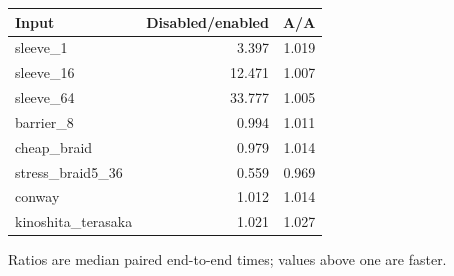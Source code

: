 \begin{center}
\begin{tabular}{@{}lrr@{}}
\toprule
Input & Disabled/enabled & A/A \\
\midrule
sleeve\_1 & 3.397 & 1.019 \\
sleeve\_16 & 12.471 & 1.007 \\
sleeve\_64 & 33.777 & 1.005 \\
barrier\_8 & 0.994 & 1.011 \\
cheap\_braid & 0.979 & 1.014 \\
stress\_braid5\_36 & 0.559 & 0.969 \\
conway & 1.012 & 1.014 \\
kinoshita\_terasaka & 1.021 & 1.027 \\
\bottomrule
\end{tabular}
\end{center}
Ratios are median paired end-to-end times; values above one are faster.
